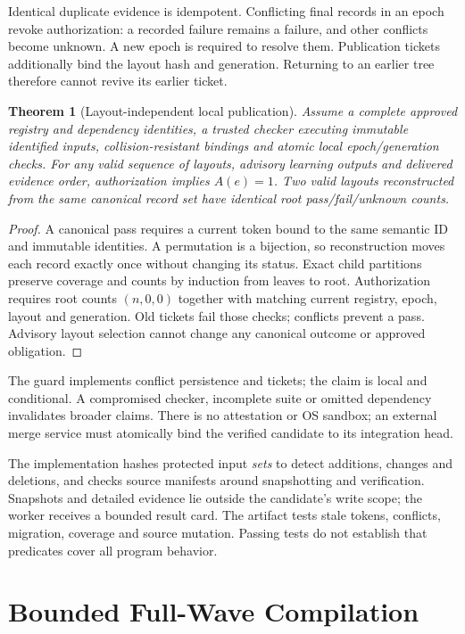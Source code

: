 \documentclass[10pt,journal,compsoc]{IEEEtran}
\newtheorem{theorem}{Theorem}
\theoremstyle{definition}\newtheorem{definition}[theorem]{Definition}
\begin{document}
Identical duplicate evidence is idempotent. Conflicting final records in an
epoch revoke authorization: a recorded failure remains a failure, and other
conflicts become unknown. A new epoch is required to resolve them.
Publication tickets additionally bind the layout hash and generation.
Returning to an earlier tree therefore cannot revive its earlier ticket.

\begin{theorem}[Layout-independent local publication]\label{thm:jsafety}
Assume a complete approved registry and dependency identities, a trusted
checker executing immutable identified inputs, collision-resistant bindings
and atomic local epoch/generation checks. For any valid sequence of layouts,
advisory learning outputs and delivered evidence order, authorization implies
$A(e)=1$. Two valid layouts reconstructed from the same canonical record set
have identical root pass/fail/unknown counts.
\end{theorem}
\begin{proof}
A canonical pass requires a current token bound to the same semantic ID and
immutable identities. A permutation is a bijection, so reconstruction moves
each record exactly once without changing its status. Exact child partitions
preserve coverage and counts by induction from leaves to root. Authorization
requires root counts $(n,0,0)$ together with matching current registry, epoch,
layout and generation. Old tickets fail those checks; conflicts prevent a
pass. Advisory layout selection cannot change any canonical outcome or
approved obligation.
\end{proof}

The guard implements conflict persistence and tickets; the claim is local
and conditional. A compromised checker, incomplete suite or omitted
dependency invalidates broader claims. There is no attestation or OS sandbox;
an external merge service must atomically bind the verified candidate to its
integration head.

The implementation hashes protected input \emph{sets} to detect additions,
changes and deletions, and checks source manifests around snapshotting and
verification. Snapshots and detailed evidence lie outside the candidate's
write scope; the worker receives a bounded result card. The artifact tests
stale tokens, conflicts, migration, coverage and source mutation. Passing
tests do not establish that predicates cover all program behavior.

\section{Bounded Full-Wave Compilation}\label{sec:jcompiler}
\end{document}
